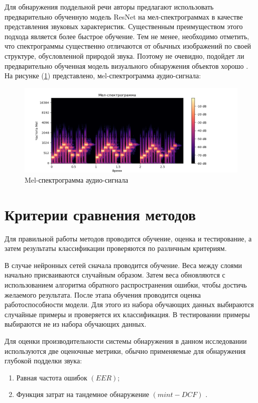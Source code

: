 Для обнаружения поддельной речи авторы предлагают использовать предварительно обученную модель ResNet на мел-спектрограммах в качестве представления звуковых характеристик. Существенным преимуществом этого подхода является более быстрое обучение. Тем не менее, необходимо отметить, что спектрограммы существенно отличаются от обычных изображений по своей структуре, обусловленной природой звука. Поэтому не очевидно, подойдет ли предварительно обученная модель визуального обнаружения объектов хорошо \cite{p2020audio}.
На рисунке (\ref{fig:mel-spec}) представлено, мel-спектрограмма аудио-сигнала: 
\begin{figure}[H]
	\centering
	\includegraphics[width=1\linewidth]{images/mel-spec.png}
	\caption{Mel-спектрограмма аудио-сигнала}
	\label{fig:mel-spec}
\end{figure}

\vspace{12pt}
{\let\clearpage\relax \chapter{Критерии сравнения методов}}

Для правильной работы методов проводится обучение, оценка и тестирование, а затем результаты классификации проверяются по различным критериям.

В случае нейронных сетей сначала проводится обучение. Веса между слоями начально присваиваются случайным образом. Затем веса обновляются с использованием алгоритма обратного распространения ошибки, чтобы достичь желаемого результата. После этапа обучения проводится оценка работоспособности модели. Для этого из набора обучающих данных выбираются случайные примеры и проверяется их классификация. В тестировании примеры выбираются не из набора обучающих данных.

Для оценки производительности системы обнаружения в данном исследовании используются две оценочные метрики, обычно применяемые для обнаружения глубокой подделки звука: 
\begin{enumerate}
    \item Равная частота ошибок \((EER)\);
    \item Функция затрат на тандемное обнаружение \((min t-DCF)\) \cite{yamagishi2021asvspoof}.
\end{enumerate}


